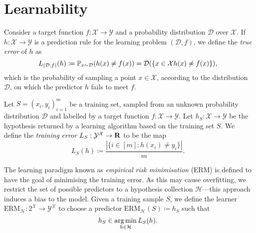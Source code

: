 \section{Learnability}

\begin{definition}
    \label{def:true-error}
    Consider a target function \(f: \mathcal{X} \to \mathcal{Y}\) and a probability
    distribution \(\mathcal{D}\) over \(\mathcal{X}\). If
    \(h: \mathcal{X} \to \mathcal{Y}\) is a prediction rule for the learning problem
    \((\mathcal{D}, f)\), we define the \emph{true error} of \(h\) as
    \[
        L_{(\mathcal{D}, f)}(h)
        \coloneq \operatorname{\mathbb{P}}_{x \sim \mathcal{D}}(h(x) \neq f(x))
        = \mathcal{D}(\{x \in \mathcal{X} \relax h(x) \neq f(x)\}),
    \]
    which is the probability of sampling a point \(x \in \mathcal{X}\), according to
    the distribution \(\mathcal{D}\), on which the predictor \(h\) fails to meet \(f\).
\end{definition}

\begin{definition}
    \label{def:training-error}
    Let \(S = (x_i, y_i)_{i=1}^m\) be a training set, sampled from an unknown
    probability distribution \(\mathcal{D}\) and labelled by a target function
    \(f: \mathcal{X} \to \mathcal{Y}\). Let \(h_S: \mathcal{X} \to \mathcal{Y}\) be the hypothesis returned by a learning
    algorithm based on the training set \(S\). We define the \emph{training error}
    \(L_S: \mathcal{Y}^{\mathcal{X}} \to \mathbf{R}\) to be the map
    \[
        L_S(h) \coloneq \frac{|\{i \in [m] \colon h(x_i) \neq y_i\}|}{m}.
    \]
\end{definition}

\begin{definition}
    \label{def:empirical-risk-minimisation}
    The learning paradigm known as \emph{empirical risk minimisation}
    (ERM) is defined to have the goal of minimising the training
    error. As this may cause overfitting, we restrict the set of possible predictors
    to a hypothesis collection \(\mathcal{H}\)---this approach induces a bias to the
    model. Given a training sample \(S\), we define the learner
    \(\text{ERM}_{\mathcal{H}}: 2^{\mathcal{X}} \to \mathcal{Y}^{\mathcal{X}}\) to
    choose a predictor \(\text{ERM}_{\mathcal{H}}(S) \coloneq h_S\) such that
    \[
        h_S \in \operatorname*{arg\,min}_{h \in \mathcal{H}} L_S(h).
    \]
\end{definition}

